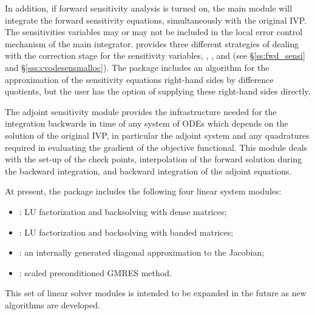 In addition, if forward sensitivity analysis is turned on, the main module 
will integrate the forward sensitivity equations, simultaneously with the original IVP.
The sensitivities variables may or may not be included in the local error control
mechanism of the main integrator.
{\cvodes} provides three different strategies of dealing with the correction
stage for the sensitivity variables, , , and
 (see \S\ref{ss:fwd_sensi} and \S\ref{sss:cvodesensmalloc}).
The {\cvodes} package includes an algorithm for the approximation of the sensitivity 
equations right-hand sides by difference quotients, but the user has the option of 
supplying these right-hand sides directly.

The adjoint sensitivity module provides the infrastructure needed for the 
integration backwards in time of any system of ODEs which depends on the solution 
of the original IVP, in particular the adjoint system and any quadratures required
in evaluating the gradient of the objective functional.
This module deals with the set-up of the check points, interpolation of the forward 
solution during the backward integration, and backward integration of the adjoint
equations. 


At present, the package includes the following four {\cvodes} linear system
modules:
\begin{itemize} 
\item {\cvdense}: LU factorization and backsolving with dense matrices; 
\item {\cvband}: LU factorization and backsolving with banded matrices; 
\item {\cvdiag}: an internally generated diagonal approximation to the 
Jacobian; 
\item {\cvspgmr}: scaled preconditioned GMRES method.
\end{itemize}
This set of linear solver modules is intended to be expanded in the
future as new algorithms are developed.


